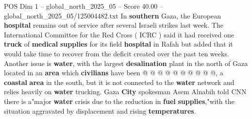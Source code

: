 \begin{textsample}{POS Dim 1 – global\_north\_2025\_05 – Score 40.00 – global\_north\_2025\_05/125004482.txt}
In \textbf{southern} Gaza, the European \textbf{hospital} remains out of service after several Israeli strikes last week.
The International Committee for the Red Cross ( ICRC ) said it had received one \textbf{truck} of \textbf{medical} \textbf{supplies} for its field \textbf{hospital} in Rafah but added that it would take time to recover from the deficit created over the past ten weeks.
Another issue is \textbf{water}, with the largest \textbf{desalination} plant in the north of Gaza located in an \textbf{area} which \textbf{civilians} have been @ @ @ @ @ @ @ @ @ @, a \textbf{coastal} \textbf{area} in the south, but it is not connected to the \textbf{water} network and relies heavily on \textbf{water} trucking.
Gaza \textbf{City} spokesman Asem Alnabih told CNN there is a"major \textbf{water} crisis due to the reduction in \textbf{fuel} \textbf{supplies},"with the situation aggravated by displacement and rising \textbf{temperatures}.

\end{textsample}
